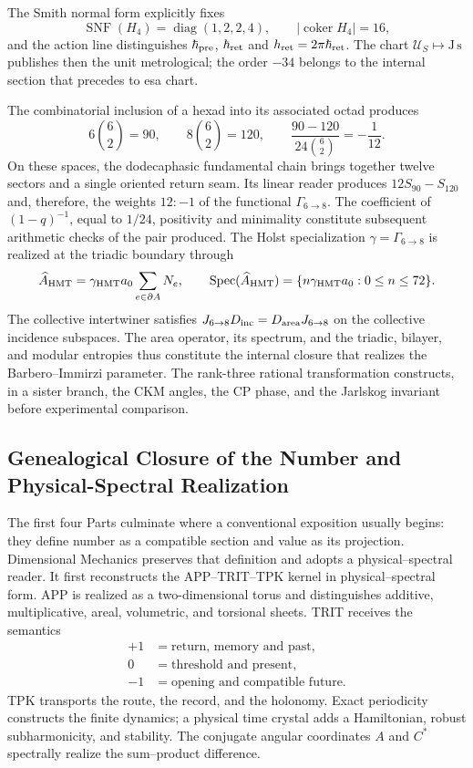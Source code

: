 The Smith normal form explicitly fixes
\[
 \operatorname{SNF}(H_4)=\operatorname{diag}(1,2,2,4),
 \qquad |\operatorname{coker}H_4|=16,
\]
and the action line distinguishes
\(\hbar_{\rm pre}\), \(\hbar_{\rm ret}\) and
\(h_{\rm ret}=2\pi\hbar_{\rm ret}\). The chart
\(\mathcal U_S\mapsto\mathrm{J\,s}\) publishes then the unit
metrological; the order \(-34\) belongs to the internal section that precedes to
esa chart.

The combinatorial inclusion of a hexad into its associated octad produces
\[
 6\binom62=90,\qquad
 8\binom62=120,
 \qquad
 \frac{90-120}{24\binom62}=-\frac1{12}.
\]
On these spaces, the dodecaphasic fundamental chain brings together twelve sectors
and a single oriented return seam. Its linear reader produces
\(12S_{90}-S_{120}\) and, therefore, the weights \(12:-1\) of the functional
\(\Gamma_{6\to8}\). The coefficient of \((1-q)^{-1}\), equal to \(1/24\),
positivity and minimality constitute subsequent arithmetic
checks of the pair produced. The Holst specialization
\(\gamma=\Gamma_{6\to8}\) is realized at the triadic boundary through
\[
 \widehat A_{\rm HMT}
 =\gamma_{\rm HMT}a_0\sum_{e\in\partial A}N_e,
 \qquad
 \operatorname{Spec}(\widehat A_{\rm HMT})
 =\{n\gamma_{\rm HMT}a_0:0\le n\le72\}.
\]
The collective intertwiner satisfies
\(J_{6\to8}D_{\rm inc}=D_{\rm area}J_{6\to8}\) on the collective incidence
subspaces. The area operator, its spectrum, and the triadic,
bilayer, and modular entropies thus constitute the internal closure that realizes the
Barbero--Immirzi parameter. The rank-three rational transformation
constructs, in a sister branch, the CKM angles, the CP phase, and the Jarlskog
invariant before experimental comparison.

\subsection*{Genealogical Closure of the Number and Physical-Spectral Realization}

The first four Parts culminate where a conventional exposition usually begins:
they define number as a compatible section and value as its projection.
Dimensional Mechanics preserves that definition and adopts a
physical--spectral reader. It first
reconstructs the APP--TRIT--TPK kernel in physical--spectral form. APP is realized
as a two-dimensional torus and distinguishes additive, multiplicative, areal,
volumetric, and torsional sheets. TRIT receives the semantics
\[
 \begin{aligned}
 +1&=\text{return, memory and past},\\
 0&=\text{threshold and present},\\
 -1&=\text{opening and compatible future}.
 \end{aligned}
\]
TPK transports the route, the record, and the holonomy. Exact periodicity
constructs the finite dynamics; a physical time crystal adds a Hamiltonian,
robust subharmonicity, and stability. The conjugate angular coordinates
\(A\) and \(C^*\) spectrally realize the sum--product difference.

